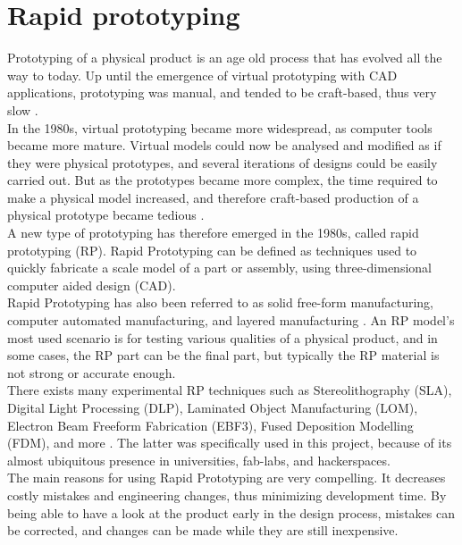 \section{Rapid prototyping}

Prototyping of a physical product is an age old process that has evolved all the way to today. Up until the emergence of virtual prototyping with CAD applications, prototyping was manual, and tended to be craft-based, thus very slow \cite{chua2010}. \\
In the 1980s, virtual prototyping became more widespread, as computer tools became more mature. Virtual models could now be analysed and modified as if they were physical prototypes, and several iterations of designs could be easily carried out. But as the prototypes became more complex, the time required to make a physical model increased, and therefore craft-based production of a physical prototype became tedious \cite{chua2010}. \\

A new type of prototyping has therefore emerged in the 1980s, called rapid prototyping (RP). Rapid Prototyping can be defined as techniques used to quickly fabricate a scale model of a part or assembly, using three-dimensional computer aided design (CAD). \\

Rapid Prototyping has also been referred to as solid free-form manufacturing, computer automated manufacturing, and layered manufacturing \cite{efunda}. An RP model's most used scenario is for testing various qualities of a physical product, and in some cases, the RP part can be the final part, but typically the RP material is not strong or accurate enough. \\

There exists many experimental RP techniques such as Stereolithography (SLA), Digital Light Processing (DLP), Laminated Object Manufacturing (LOM), Electron Beam Freeform Fabrication (EBF3), Fused Deposition Modelling (FDM), and more \cite{wiki3D}. The latter was specifically used in this project, because of its almost ubiquitous presence in universities, fab-labs, and hackerspaces. \\

The main reasons for using Rapid Prototyping are very compelling. It decreases costly mistakes and engineering changes, thus minimizing development time. By being able to have a look at the product early in the design process, mistakes can be corrected, and changes can be made while they are still inexpensive. \\


